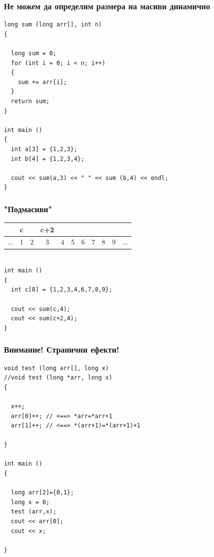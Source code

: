 \documentclass{beamer}
\begin{document}
\begin{frame}[fragile]
\frametitle{Не можем да определим размера на масиви динамично}

\begin{flushleft}
\begin{lstlisting}
long sum (long arr[], int n)
{

  long sum = 0;
  for (int i = 0; i < n; i++)
  {
    sum += arr[i];
  }
  return sum;
}

int main ()
{
  int a[3] = {1,2,3};
  int b[4] = {1,2,3,4};

  cout << sum(a,3) << " " << sum (b,4) << endl;
}

\end{lstlisting}
\end{flushleft}

\end{frame}


\begin{frame}[fragile]
\frametitle{"Подмасиви"}

\begin{tabular} {c|c|c|c|c|c|c|c|c|c|c }

    &  c   &    & c+2 \\\hline
... &1     & 2  & \alert{3}  & \alert{4} & \alert{5} &  \alert{6} & 7 & 8 & 9 &...  \\\hline

\end{tabular}

\begin{flushleft}
\begin{lstlisting}

int main ()
{
  int c[8] = {1,2,3,4,6,7,8,9};

  cout << sum(c,4);
  cout << sum(c+2,4);
}

\end{lstlisting}
\end{flushleft}

\end{frame}


\begin{frame}[fragile]
\frametitle{Внимание! Странични ефекти! }

\begin{flushleft}
\begin{lstlisting}
void test (long arr[], long x)
//void test (long *arr, long x)
{

  x++;
  arr[0]++; // <==> *arr=*arr+1
  arr[1]++; // <==> *(arr+1)=*(arr+1)+1

}

int main ()
{

  long arr[2]={0,1};
  long x = 0;
  test (arr,x);
  cout << arr[0];
  cout << x;

}

\end{lstlisting}
\end{flushleft}

\end{frame}
\end{document}

